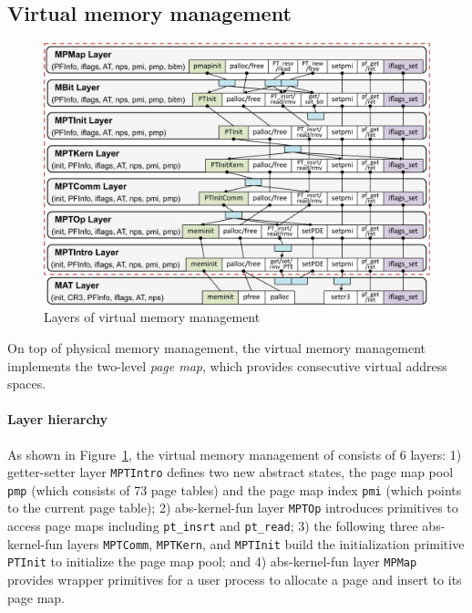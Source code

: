 \subsection{Virtual memory management}
\label{sec:base:vmm} 

\begin{figure}\centering
\includegraphics[scale=0.5]{figs/vmm_layer}	
\caption{Layers of virtual memory management}
\label{fig:base:vmm:layers}
\hrulefill
\end{figure}

On top of physical memory management,
the virtual memory management implements
the two-level \emph{page map}, which
provides consecutive virtual address spaces.

\paragraph{Layer hierarchy}
As shown in
Figure~\ref{fig:base:vmm:layers}, the virtual memory management of
\mCTOSbase{} consists of 6 layers: 1) getter-setter layer \verb"MPTIntro"
defines two new abstract states, the page map pool \verb"pmp" (which
consists of 73 page tables) and the page map index \verb"pmi" (which
points to the current page table); 
2) abs-kernel-fun layer \verb"MPTOp"
introduces primitives to access page maps including \verb"pt_insrt" and \verb"pt_read"; 3) the following three abs-kernel-fun layers
\verb"MPTComm", \verb"MPTKern", and \verb"MPTInit" build the
initialization primitive \verb"PTInit" to initialize the page map pool;
and 4) abs-kernel-fun layer \verb"MPMap" 
provides wrapper primitives
for a user process to allocate a page and insert to its page map.



